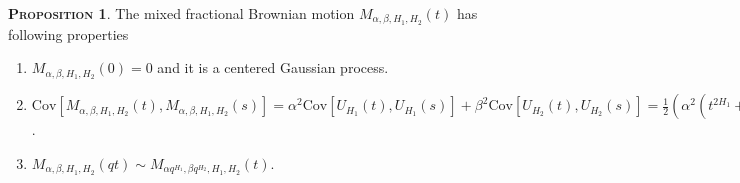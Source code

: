 \documentclass[a4paper, twoside, 11pt]{article}
\theoremstyle{definition}
\newtheorem{proposition}[definition]{\scshape Proposition}
\newcommand{\brkt}[1]{\left({#1} \right)}
\begin{document}
\begin{proposition}
  The mixed fractional Brownian motion $M_{\alpha,\beta,H_1,H_2}(t)$ has following properties
   \begin{enumerate}[topsep=0pt, itemsep=-1ex, partopsep=1ex, parsep=1ex, label=(\roman*)]
	 \item $M_{\alpha,\beta,H_1,H_2}(0) = 0$ and it is a centered Gaussian  process.
	 \item $\mathrm{Cov}[M_{\alpha,\beta,H_1,H_2}(t), M_{\alpha,\beta,H_1,H_2}(s)] = \alpha^2 \mathrm{Cov}[U_{H_1}(t), U_{H_1}(s)] + \beta^2\mathrm{Cov}[U_{H_2}(t), U_{H_2}(s)] = \frac{1}{2}\brkt{\alpha^2(t^{2H_1}+s^{2H_1}+|t-s|^{2H_1}) + \beta^2(t^{2H_2} + s^{2H_2} + |t-s|^{2H_2})}$. 
	 \item $M_{\alpha, \beta, H_1, H_2}(qt) \sim M_{\alpha q^{H_1}, \beta q^{H_2}, H_1, H_2}(t)$. 
	 \end{enumerate}
	 \label{sec:prop}
\end{proposition}
\end{document}

